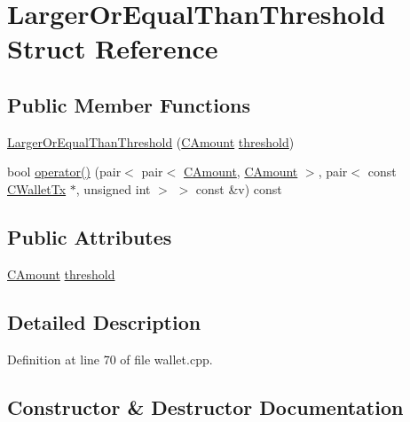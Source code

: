 \hypertarget{struct_larger_or_equal_than_threshold}{}\section{Larger\+Or\+Equal\+Than\+Threshold Struct Reference}
\label{struct_larger_or_equal_than_threshold}
\subsection*{Public Member Functions}
\begin{DoxyCompactItemize}
\item 
\hyperlink{struct_larger_or_equal_than_threshold_aa61771bc8292eaef60bfc9bc16ad2248}{Larger\+Or\+Equal\+Than\+Threshold} (\hyperlink{amount_8h_a4eaf3a5239714d8c45b851527f7cb564}{C\+Amount} \hyperlink{struct_larger_or_equal_than_threshold_a719c9b4c0f65d5bd7b4f5d3b97f88550}{threshold})
\item 
bool \hyperlink{struct_larger_or_equal_than_threshold_a9f80c5f48a47ff4f2e630926a3f22919}{operator()} (pair$<$ pair$<$ \hyperlink{amount_8h_a4eaf3a5239714d8c45b851527f7cb564}{C\+Amount}, \hyperlink{amount_8h_a4eaf3a5239714d8c45b851527f7cb564}{C\+Amount} $>$, pair$<$ const \hyperlink{class_c_wallet_tx}{C\+Wallet\+Tx} $\ast$, unsigned int $>$ $>$ const \&v) const 
\end{DoxyCompactItemize}
\subsection*{Public Attributes}
\begin{DoxyCompactItemize}
\item 
\hyperlink{amount_8h_a4eaf3a5239714d8c45b851527f7cb564}{C\+Amount} \hyperlink{struct_larger_or_equal_than_threshold_a719c9b4c0f65d5bd7b4f5d3b97f88550}{threshold}
\end{DoxyCompactItemize}


\subsection{Detailed Description}


Definition at line 70 of file wallet.\+cpp.



\subsection{Constructor \& Destructor Documentation}
\hypertarget{struct_larger_or_equal_than_threshold_aa61771bc8292eaef60bfc9bc16ad2248}{}
